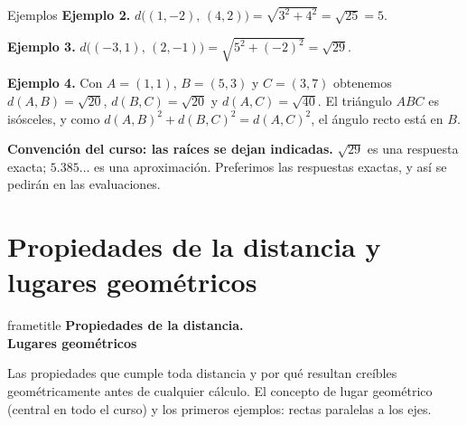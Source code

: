 \documentclass[aspectratio=169,10pt]{beamer}
\newcommand{\destaca}[1]{%
  \par\vspace{3pt}\noindent
  \colorbox{turquesaClaro}{%
    \parbox{\dimexpr\linewidth-2\fboxsep\relax}{\vspace{3pt}#1\vspace{3pt}}}%
  \par\vspace{3pt}}
\newcommand{\hojaSesion}[2]{%
  \vfill
  \begin{beamercolorbox}[wd=\textwidth,sep=16pt,center]{frametitle}
    {\Large\bfseries #1}\\[11pt]
    \begin{minipage}{0.82\textwidth}\centering\small #2\end{minipage}
  \end{beamercolorbox}
  \vfill}
\begin{document}
\begin{frame}{Ejemplos}
  \textbf{Ejemplo 2.} $d\bigl((1,-2),\,(4,2)\bigr)
    =\sqrt{3^2+4^2}=\sqrt{25}=5$.

  \vspace{0.4cm}

  \textbf{Ejemplo 3.} $d\bigl((-3,1),\,(2,-1)\bigr)
    =\sqrt{5^2+(-2)^2}=\sqrt{29}$.

  \vspace{0.4cm}

  \textbf{Ejemplo 4.} Con $A=(1,1)$, $B=(5,3)$ y $C=(3,7)$ obtenemos
  $d(A,B)=\sqrt{20}$, $d(B,C)=\sqrt{20}$ y $d(A,C)=\sqrt{40}$. El
  triángulo $ABC$ es isósceles, y como
  $d(A,B)^2+d(B,C)^2=d(A,C)^2$, el ángulo recto está en $B$.

  \vspace{0.4cm}
  \destaca{\textbf{Convención del curso: las raíces se dejan indicadas.}
  $\sqrt{29}$ es una respuesta exacta; $5.385\ldots$ es una aproximación.
  Preferimos las respuestas exactas, y así se pedirán en las
  evaluaciones.}
\end{frame}

\section{Propiedades de la distancia y lugares geométricos}
\begin{frame}[plain]
  \hojaSesion{Propiedades de la distancia.\\ Lugares geométricos}{%
  Las propiedades que cumple toda distancia y por qué resultan
  creíbles geométricamente antes de cualquier cálculo. El concepto de
  lugar geométrico (central en todo el curso) y los primeros
  ejemplos: rectas paralelas a los ejes.}
\end{frame}
\end{document}
